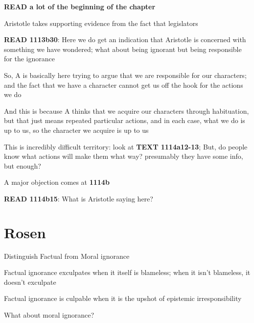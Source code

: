 \documentclass[11pt]{article}
\begin{document}
\noindent\textbf{READ a lot of the beginning of the chapter}
\vspace*{2mm}

\noindent Aristotle takes supporting evidence from the fact that legislators 
\vspace*{2mm}

\noindent\textbf{READ 1113b30}: Here we do get an indication that Aristotle is concerned with something we have wondered; what about being ignorant but being responsible for the ignorance
\vspace*{2mm}

\noindent So, A is basically here trying to argue that we are responsible for our characters; and the fact that we have a character cannot get us off the hook for the actions we do
\vspace*{2mm}

\noindent And this is because A thinks that we acquire our characters through habituation, but that just means repeated particular actions, and in each case, what we do is up to us, so the character we acquire is up to us
\vspace*{2mm}

\noindent This is incredibly difficult territory: look at \textbf{TEXT 1114a12-13}; But, do people know what actions will make them what way? presumably they have some info, but enough?
\vspace*{2mm}

\noindent A major objection comes at \textbf{1114b}
\vspace*{2mm}

\noindent\textbf{READ 1114b15}: What is Aristotle saying here?

\section*{Rosen}

\noindent Distinguish Factual from Moral ignorance
\vspace*{2mm}

\noindent Factual ignorance exculpates when it itself is blameless; when it isn't blameless, it doesn't exculpate
\vspace*{2mm}

\noindent Factual ignorance is culpable when it is the upshot of epistemic irresponsibility
\vspace*{2mm}

\noindent What about moral ignorance?
\vspace*{2mm}
\end{document}
